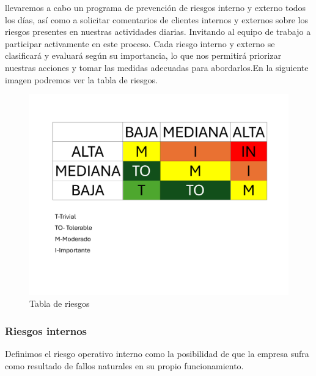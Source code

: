 llevaremos a cabo un programa de prevención de riesgos interno y externo todos los días, así como a solicitar comentarios de clientes internos y externos sobre los riesgos presentes en nuestras actividades diarias. Invitando al equipo de trabajo a participar activamente en este proceso.
Cada riesgo interno y externo se clasificará y evaluará según su importancia, lo que nos permitirá priorizar nuestras acciones y tomar las medidas adecuadas para abordarlos.En la siguiente imagen podremos ver la tabla de riesgos.
% 
% 
\begin{figure}[H]
    \centering
    \includegraphics[scale=0.3]{13/img/EvaluacionRiesgo.pdf}
    \caption{Tabla de riesgos}
\end{figure}
% 
% 
\subsubsection{Riesgos internos}

Definimos el riesgo operativo interno como la posibilidad de que la empresa sufra como resultado de fallos naturales en su propio funcionamiento.

